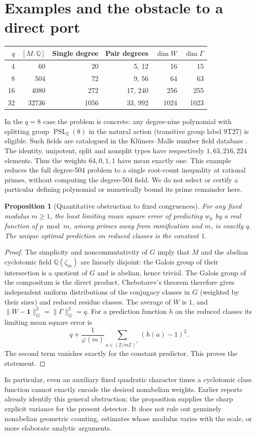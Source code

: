 \documentclass[11pt]{article}
\newtheorem{proposition}[theorem]{Proposition}
\theoremstyle{remark}\newtheorem{remark}[theorem]{Remark}
\DeclareMathOperator{\PSL}{PSL}\DeclareMathOperator{\SL}{SL}\DeclareMathOperator{\PGL}{PGL}\DeclareMathOperator{\Ind}{Ind}\DeclareMathOperator{\ord}{ord}\DeclareMathOperator{\Gal}{Gal}\DeclareMathOperator{\Tr}{Tr}\DeclareMathOperator{\Rea}{Re}\DeclareMathOperator{\FP}{FP}
\newcommand{\Q}{\mathbb Q}\newcommand{\C}{\mathbb C}\newcommand{\F}{\mathbb F}\newcommand{\one}{\mathbf 1}\newcommand{\St}{\mathrm{St}}\newcommand{\Gg}{\Gamma}\newcommand{\PT}{\mathcal P}\newcommand{\eps}{\varepsilon}
\begin{document}
\section{Examples and the obstacle to a direct port}
\begin{center}
\begin{tabular}{@{}rrrrrr@{}}\toprule
$q$ & $[M:\Q]$ & Single degree & Pair degrees & $\dim W$ & $\dim\Gg$\\\midrule
4 & 60 & 20 & 5, 12 & 16 & 15\\
8 & 504 & 72 & 9, 56 & 64 & 63\\
16 & 4080 & 272 & 17, 240 & 256 & 255\\
32 & 32736 & 1056 & 33, 992 & 1024 & 1023\\\bottomrule
\end{tabular}
\end{center}
In the $q=8$ case the problem is concrete: any degree-nine polynomial with splitting group $\PSL_2(8)$ in the natural action (transitive group label 9T27) is eligible. Such fields are catalogued in the Kl\"uners--Malle number field database \cite{lmfdb}. The identity, unipotent, split and nonsplit types have respectively $1,63,216,224$ elements. Thus the weights $64,0,1,1$ have mean exactly one. This example reduces the full degree-504 problem to a single root-count inequality at rational primes, without computing the degree-504 field. We do not select or certify a particular defining polynomial or numerically bound its prime remainder here.

\begin{proposition}[Quantitative obstruction to fixed congruences]\label{prop:obstruction}
For any fixed modulus $m\ge1$, the least limiting mean square error of predicting $w_p$ by a real function of $p\bmod m$, among primes away from ramification and $m$, is exactly $q$. The unique optimal prediction on reduced classes is the constant $1$.
\end{proposition}
\begin{proof}
The simplicity and noncommutativity of $G$ imply that $M$ and the abelian cyclotomic field $\Q(\zeta_m)$ are linearly disjoint: the Galois group of their intersection is a quotient of $G$ and is abelian, hence trivial. The Galois group of the compositum is the direct product. Chebotarev's theorem \cite{neukirch} therefore gives independent uniform distributions of the conjugacy classes in $G$ (weighted by their sizes) and reduced residue classes. The average of $W$ is $1$, and $\|W-\one\|_G^2=\|\Gg\|_G^2=q$. For a prediction function $h$ on the reduced classes its limiting mean square error is
\[
 q+\frac{1}{\varphi(m)}\sum_{a\in(\mathbb Z/m\mathbb Z)^\times}(h(a)-1)^2.
\]
The second term vanishes exactly for the constant predictor. This proves the statement.
\end{proof}
In particular, even an auxiliary fixed quadratic character times a cyclotomic class function cannot exactly encode the desired nonabelian weights. Earlier reports already identify this general obstruction; the proposition supplies the sharp explicit variance for the present detector. It does not rule out genuinely nonabelian geometric counting, estimates whose modulus varies with the scale, or more elaborate analytic arguments.
\end{document}
